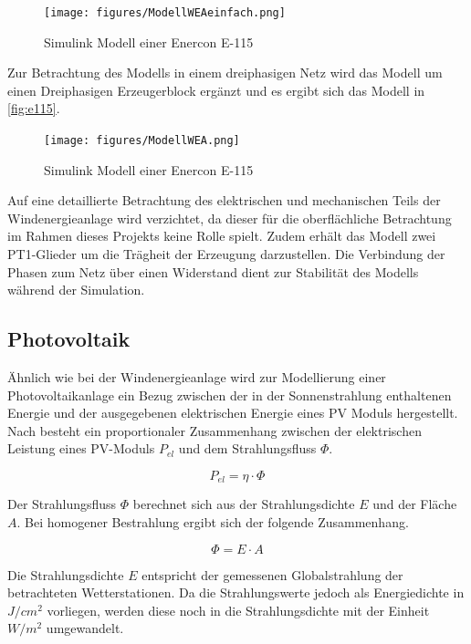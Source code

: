 \begin{figure}[H]
	\centering
	\texttt{[image: figures/ModellWEAeinfach.png]}
	\caption{Simulink Modell einer Enercon E-115}
	\label{fig:simulinkWEA}
\end{figure}

Zur Betrachtung des Modells in einem dreiphasigen Netz wird das Modell um einen Dreiphasigen Erzeugerblock ergänzt und es ergibt sich das Modell in \autoref{fig:e115}. 

\begin{figure}[H]
	\centering
	\texttt{[image: figures/ModellWEA.png]}
	\caption{Simulink Modell einer Enercon E-115}
	\label{fig:e115}
\end{figure}

Auf eine detaillierte Betrachtung des elektrischen und mechanischen Teils der Windenergieanlage wird verzichtet, da dieser für die oberflächliche Betrachtung im Rahmen dieses Projekts keine Rolle spielt. Zudem erhält das Modell zwei PT1-Glieder um die Trägheit der Erzeugung darzustellen. Die Verbindung der Phasen zum Netz über einen Widerstand dient zur Stabilität des Modells während der Simulation.

\subsection{Photovoltaik}

Ähnlich wie bei der Windenergieanlage wird zur Modellierung einer Photovoltaikanlage ein Bezug zwischen der in der Sonnenstrahlung enthaltenen Energie und der ausgegebenen elektrischen Energie eines PV Moduls hergestellt. Nach \cite{PV} besteht ein proportionaler Zusammenhang zwischen der elektrischen Leistung eines PV-Moduls $P_{el}$ und dem Strahlungsfluss $\Phi$. 

\begin{equation}
	P_{el} = \eta \cdot \Phi
\end{equation}

Der Strahlungsfluss $\Phi$ berechnet sich aus der Strahlungsdichte $E$ und der Fläche $A$. Bei homogener Bestrahlung ergibt sich der folgende Zusammenhang.

\begin{equation}
	\Phi = E \cdot A
\end{equation}

Die Strahlungsdichte $E$ entspricht der gemessenen Globalstrahlung der betrachteten Wetterstationen. Da die Strahlungswerte jedoch als Energiedichte in $J/cm^2$ vorliegen, werden diese noch in die Strahlungsdichte mit der Einheit $W/m^2$ umgewandelt.

